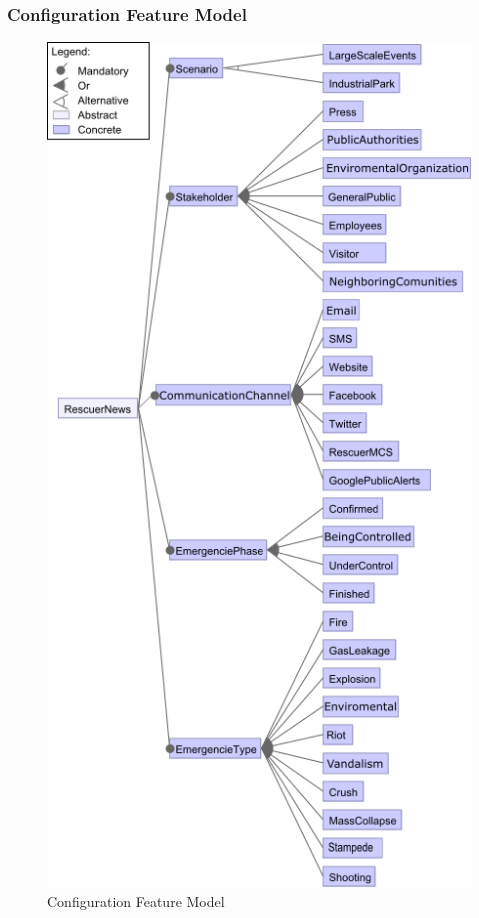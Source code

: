 \subsubsection{Configuration Feature Model}\label{sec:configuration}

\begin{figure}
\begin{center}
  \includegraphics[width=\linewidth]{images/FMConfiguracao}
\caption{Configuration Feature Model}
\label{fig:FMConf}
\end{center}
\end{figure}


